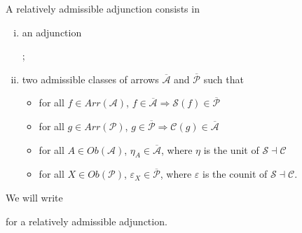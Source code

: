 \begin{definition}
\label{def:AdmissibleAdjunction}
    A relatively admissible adjunction consists in
    \begin{enumerate}[(i)]
        \item an adjunction
        ;
        \item two admissible classes of arrows $\overline{\mathcal{A}}$ and $\overline{\mathcal{P}}$ such that
        \begin{itemize}
            \item for all $f\in Arr(\mathcal{A})$, $f\in\overline{\mathcal{A}}\Longrightarrow\mathcal{S}(f)\in\overline{\mathcal{P}}$
            \item for all $g\in Arr(\mathcal{P})$, $g\in\overline{\mathcal{P}}\Longrightarrow\mathcal{C}(g)\in\overline{\mathcal{A}}$
            \item for all $A\in Ob(\mathcal{A})$, $\eta_A\in\overline{\mathcal{A}}$, where $\eta$ is the unit of $\mathcal{S}\dashv\mathcal{C}$
            \item for all $X\in Ob(\mathcal{P})$, $\varepsilon_X\in\overline{\mathcal{P}}$, where $\varepsilon$ is the counit of $\mathcal{S}\dashv\mathcal{C}$.
        \end{itemize}
    \end{enumerate}
    We will write 
    for a relatively admissible adjunction.
\end{definition}

